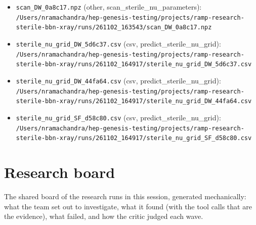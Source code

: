 \documentclass[11pt,a4paper]{article}
\begin{document}
\begin{itemize}
  \item \texttt{scan\_\allowbreak{}DW\_\allowbreak{}0a8c17.npz} (other, scan\_sterile\_nu\_parameters): \texttt{/\allowbreak{}Users/\allowbreak{}nramachandra/\allowbreak{}hep-genesis-testing/\allowbreak{}projects/\allowbreak{}ramp-research-sterile-bbn-xray/\allowbreak{}runs/\allowbreak{}261102\_\allowbreak{}163543/\allowbreak{}scan\_\allowbreak{}DW\_\allowbreak{}0a8c17.npz}
  \item \texttt{sterile\_\allowbreak{}nu\_\allowbreak{}grid\_\allowbreak{}DW\_\allowbreak{}5d6c37.csv} (csv, predict\_sterile\_nu\_grid): \texttt{/\allowbreak{}Users/\allowbreak{}nramachandra/\allowbreak{}hep-genesis-testing/\allowbreak{}projects/\allowbreak{}ramp-research-sterile-bbn-xray/\allowbreak{}runs/\allowbreak{}261102\_\allowbreak{}164917/\allowbreak{}sterile\_\allowbreak{}nu\_\allowbreak{}grid\_\allowbreak{}DW\_\allowbreak{}5d6c37.csv}
  \item \texttt{sterile\_\allowbreak{}nu\_\allowbreak{}grid\_\allowbreak{}DW\_\allowbreak{}44fa64.csv} (csv, predict\_sterile\_nu\_grid): \texttt{/\allowbreak{}Users/\allowbreak{}nramachandra/\allowbreak{}hep-genesis-testing/\allowbreak{}projects/\allowbreak{}ramp-research-sterile-bbn-xray/\allowbreak{}runs/\allowbreak{}261102\_\allowbreak{}164917/\allowbreak{}sterile\_\allowbreak{}nu\_\allowbreak{}grid\_\allowbreak{}DW\_\allowbreak{}44fa64.csv}
  \item \texttt{sterile\_\allowbreak{}nu\_\allowbreak{}grid\_\allowbreak{}SF\_\allowbreak{}d58c80.csv} (csv, predict\_sterile\_nu\_grid): \texttt{/\allowbreak{}Users/\allowbreak{}nramachandra/\allowbreak{}hep-genesis-testing/\allowbreak{}projects/\allowbreak{}ramp-research-sterile-bbn-xray/\allowbreak{}runs/\allowbreak{}261102\_\allowbreak{}164917/\allowbreak{}sterile\_\allowbreak{}nu\_\allowbreak{}grid\_\allowbreak{}SF\_\allowbreak{}d58c80.csv}
\end{itemize}

\section{Research board}
\label{app:board}
The shared board of the research runs in this session, generated mechanically: what the team set out to investigate, what it found (with the tool calls that are the evidence), what failed, and how the critic judged each wave.
\end{document}
